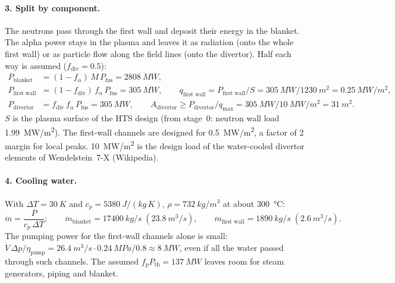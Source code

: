 \documentclass[10pt,a4paper]{article}
\begin{document}
\paragraph{3. Split by component.} The neutrons pass through the first wall and deposit their energy in the
blanket. The alpha power stays in the plasma and leaves it as radiation (onto the whole first wall) or as particle
flow along the field lines (onto the divertor). Half each way is assumed ($f_\text{div} = 0.5$):
\begin{align*}
P_\text{blanket}  &= (1-f_\alpha)\,M\,P_\text{fus} = \SI{2808}{MW},\\
P_\text{first wall} &= (1-f_\text{div})\,f_\alpha\,P_\text{fus} = \SI{305}{MW},\qquad
q_\text{first wall} = P_\text{first wall}/S = \SI{305}{MW}/\SI{1230}{m^2} = \SI{0.25}{MW/m^2},\\
P_\text{divertor} &= f_\text{div}\,f_\alpha\,P_\text{fus} = \SI{305}{MW},\qquad
A_\text{divertor} \ge P_\text{divertor}/q_\text{max} = \SI{305}{MW}/\SI{10}{MW/m^2} = \SI{31}{m^2}.
\end{align*}
$S$ is the plasma surface of the HTS design (from stage~0: neutron wall load \SI{1.99}{MW/m^2}). The first-wall
channels are designed for \SI{0.5}{MW/m^2}, a factor of 2 margin for local peaks. \SI{10}{MW/m^2} is the design
load of the water-cooled divertor elements of Wendelstein~7-X (Wikipedia).

\paragraph{4. Cooling water.} With $\Delta T = \SI{30}{K}$ and $c_p = \SI{5380}{J/(kg\,K)}$, $\rho = \SI{732}{kg/m^3}$
at about \SI{300}{\celsius}:
\[ \dot m = \frac{P}{c_p\,\Delta T}:\qquad \dot m_\text{blanket} = \SI{17400}{kg/s}\;(\SI{23.8}{m^3/s}),\qquad
   \dot m_\text{first wall} = \SI{1890}{kg/s}\;(\SI{2.6}{m^3/s}). \]
The pumping power for the first-wall channels alone is small: $\dot V\,\Delta p/\eta_\text{pump} =
\SI{26.4}{m^3/s}\cdot\SI{0.24}{MPa}/0.8 \approx \SI{8}{MW}$, even if all the water passed through such channels.
The assumed $f_p P_\text{th} = \SI{137}{MW}$ leaves room for steam generators, piping and blanket.
\end{document}
